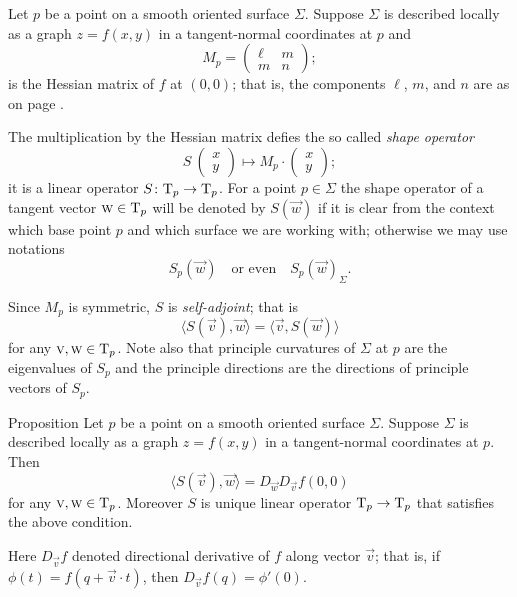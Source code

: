 Let $p$ be a point on a smooth oriented surface $\Sigma$.
Suppose $\Sigma$ is described locally as a graph $z=f(x,y)$ in a tangent-normal coordinates at $p$
and 
\[M_p=\begin{pmatrix}
   \ell
   &m
   \\
   m
   &n
  \end{pmatrix};
\]
is the Hessian matrix of $f$ at $(0,0)$; that is, the components $\ell$, $m$, and $n$ are as on page \pageref{page:lmn}.

The multiplication by the Hessian matrix defies the so called \emph{shape operator}
\[S\:(\begin{smallmatrix}
x\\y
\end{smallmatrix})
\mapsto
M_p\cdot(\begin{smallmatrix}
x\\y
\end{smallmatrix});\]
it is a linear operator $S\colon\mathrm{T}_p\to \mathrm{T}_p$.
For a point $p\in \Sigma$ the shape operator of a tangent vector $\textsc w\in \mathrm{T}_p$ will be denoted by $S(\vec w)$ if it is clear from the context which base point $p$ and which surface we are working with;
otherwise we may use notations 
\[S_p(\vec w)\quad\text{or even}\quad S_p(\vec w)_\Sigma.\]

Since $M_p$ is symmetric, $S$ is \emph{self-adjoint}; that is
\[\langle S(\vec v),\vec w\rangle=\langle \vec v,S(\vec w)\rangle\]
for any $\textsc v,\textsc w\in\mathrm{T}_p$.
Note also that principle curvatures of $\Sigma$ at $p$ are the eigenvalues of $S_p$ and the principle directions are the directions of principle vectors of $S_p$.

\begin{thm}{Proposition}\label{prop:shape=D2}
Let $p$ be a point on a smooth oriented surface $\Sigma$.
Suppose $\Sigma$ is described locally as a graph $z=f(x,y)$ in a tangent-normal coordinates at $p$.
Then
\[\langle S(\vec v),\vec w\rangle=D_{\vec w}D_{\vec v}f(0,0)\]
for any $\textsc v,\textsc w\in\mathrm{T}_p$.
Moreover $S$ is unique linear operator $\mathrm{T}_p\to\mathrm{T}_p$ that satisfies the above condition.
\end{thm}

Here $D_{\vec v}f$ denoted directional derivative of $f$ along vector $\vec v$;
that is, if $\phi(t)=f(q+\vec v\cdot t)$, then $D_{\vec v}f(q)=\phi'(0)$.

